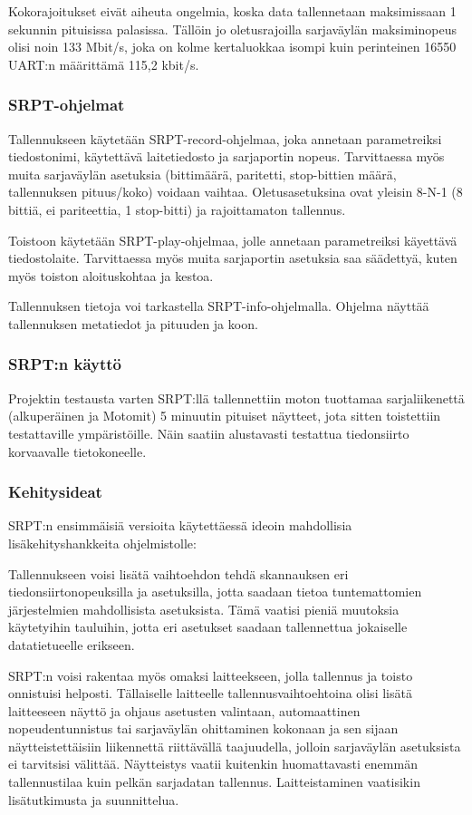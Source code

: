 Kokorajoitukset eivät aiheuta ongelmia, koska data tallennetaan maksimissaan 1 sekunnin pituisissa palasissa. Tällöin jo oletusrajoilla sarjaväylän maksiminopeus olisi noin 133 Mbit/s, joka on kolme kertaluokkaa isompi kuin perinteinen 16550 UART:n määrittämä 115,2 kbit/s. \citep{sqlite:limits}

\subsubsection{SRPT-ohjelmat}
Tallennukseen käytetään SRPT-record-ohjelmaa, joka annetaan parametreiksi tiedostonimi, käytettävä laitetiedosto ja sarjaportin nopeus. Tarvittaessa myös muita sarjaväylän asetuksia (bittimäärä, paritetti, stop-bittien määrä, tallennuksen pituus/koko) voidaan vaihtaa. Oletusasetuksina ovat yleisin 8-N-1 (8 bittiä, ei pariteettia, 1 stop-bitti) ja rajoittamaton tallennus.

Toistoon käytetään SRPT-play-ohjelmaa, jolle annetaan parametreiksi käyettävä tiedostolaite. Tarvittaessa myös muita sarjaportin asetuksia saa säädettyä, kuten myös toiston aloituskohtaa ja kestoa.

Tallennuksen tietoja voi tarkastella SRPT-info-ohjelmalla. Ohjelma näyttää tallennuksen metatiedot ja pituuden ja koon.

\subsubsection{SRPT:n käyttö}
Projektin testausta varten SRPT:llä tallennettiin moton tuottamaa sarjaliikenettä (alkuperäinen ja Motomit) 5 minuutin pituiset näytteet, jota sitten toistettiin testattaville ympäristöille. Näin saatiin alustavasti testattua tiedonsiirto korvaavalle tietokoneelle.

\subsubsection{Kehitysideat}
SRPT:n ensimmäisiä versioita käytettäessä ideoin mahdollisia lisäkehityshankkeita ohjelmistolle:

Tallennukseen voisi lisätä vaihtoehdon tehdä skannauksen eri tiedonsiirtonopeuksilla ja asetuksilla, jotta saadaan tietoa tuntemattomien järjestelmien mahdollisista asetuksista. Tämä vaatisi pieniä muutoksia käytetyihin tauluihin, jotta eri asetukset saadaan tallennettua jokaiselle datatietueelle erikseen.

SRPT:n voisi rakentaa myös omaksi laitteekseen, jolla tallennus ja toisto onnistuisi helposti. Tällaiselle laitteelle tallennusvaihtoehtoina olisi lisätä laitteeseen näyttö ja ohjaus asetusten valintaan, automaattinen nopeudentunnistus tai sarjaväylän ohittaminen kokonaan ja sen sijaan näytteistettäisiin liikennettä riittävällä taajuudella, jolloin sarjaväylän asetuksista ei tarvitsisi välittää. Näytteistys vaatii kuitenkin huomattavasti enemmän tallennustilaa kuin pelkän sarjadatan tallennus. Laitteistaminen vaatisikin lisätutkimusta ja suunnittelua.

